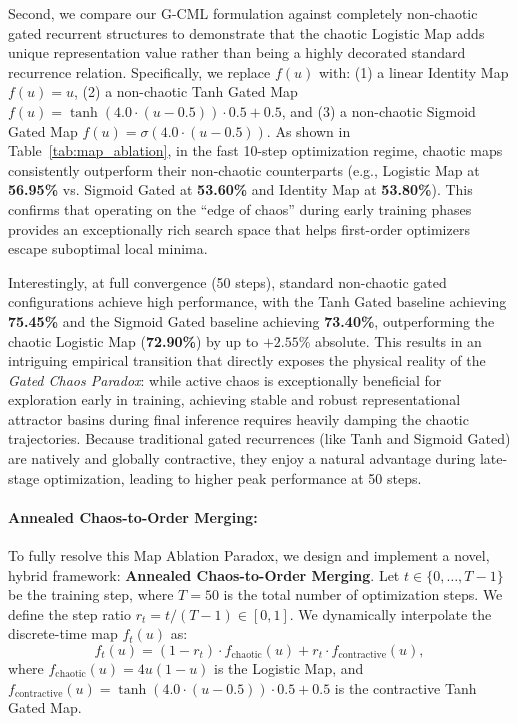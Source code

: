 Second, we compare our G-CML formulation against completely non-chaotic gated recurrent structures to demonstrate that the chaotic Logistic Map adds unique representation value rather than being a highly decorated standard recurrence relation. Specifically, we replace $f(u)$ with: (1) a linear Identity Map $f(u) = u$, (2) a non-chaotic Tanh Gated Map $f(u) = \tanh(4.0 \cdot (u-0.5)) \cdot 0.5 + 0.5$, and (3) a non-chaotic Sigmoid Gated Map $f(u) = \sigma(4.0 \cdot (u-0.5))$. As shown in Table~\ref{tab:map_ablation}, in the fast 10-step optimization regime, chaotic maps consistently outperform their non-chaotic counterparts (e.g., Logistic Map at \textbf{56.95\%} vs. Sigmoid Gated at \textbf{53.60\%} and Identity Map at \textbf{53.80\%}). This confirms that operating on the ``edge of chaos'' during early training phases provides an exceptionally rich search space that helps first-order optimizers escape suboptimal local minima.

Interestingly, at full convergence (50 steps), standard non-chaotic gated configurations achieve high performance, with the Tanh Gated baseline achieving \textbf{75.45\%} and the Sigmoid Gated baseline achieving \textbf{73.40\%}, outperforming the chaotic Logistic Map (\textbf{72.90\%}) by up to $+2.55\%$ absolute. This results in an intriguing empirical transition that directly exposes the physical reality of the \emph{Gated Chaos Paradox}: while active chaos is exceptionally beneficial for exploration early in training, achieving stable and robust representational attractor basins during final inference requires heavily damping the chaotic trajectories. Because traditional gated recurrences (like Tanh and Sigmoid Gated) are natively and globally contractive, they enjoy a natural advantage during late-stage optimization, leading to higher peak performance at 50 steps.

\paragraph{Annealed Chaos-to-Order Merging:}
To fully resolve this Map Ablation Paradox, we design and implement a novel, hybrid framework: \textbf{Annealed Chaos-to-Order Merging}. Let $t \in \{0, \dots, T-1\}$ be the training step, where $T=50$ is the total number of optimization steps. We define the step ratio $r_t = t / (T-1) \in [0, 1]$. We dynamically interpolate the discrete-time map $f_t(u)$ as:
\begin{equation}
f_t(u) = (1 - r_t) \cdot f_{\text{chaotic}}(u) + r_t \cdot f_{\text{contractive}}(u),
\end{equation}
where $f_{\text{chaotic}}(u) = 4u(1-u)$ is the Logistic Map, and $f_{\text{contractive}}(u) = \tanh(4.0 \cdot (u-0.5)) \cdot 0.5 + 0.5$ is the contractive Tanh Gated Map. 

